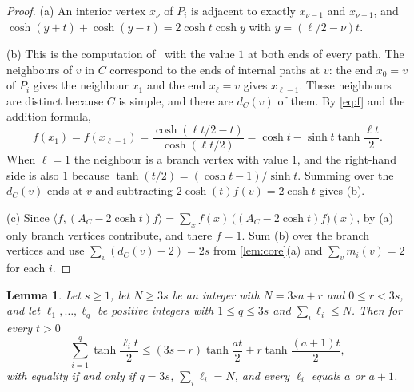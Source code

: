 \documentclass[11pt]{article}
\newtheorem{lemma}[theorem]{Lemma}
\theoremstyle{definition}
\theoremstyle{remark}
\begin{document}
\begin{proof}
(a) An interior vertex $x_\nu$ of $P_i$ is adjacent to exactly $x_{\nu-1}$ and $x_{\nu+1}$, and
$\cosh(y+t)+\cosh(y-t)=2\cosh t\cosh y$ with $y=(\ell/2-\nu)t$.

(b) This is the computation of~\cite[pp.~99--100]{Be19} with the value $1$ at both ends of every path. The neighbours
of $v$ in $C$ correspond to the ends of internal paths at $v$: the end $x_0=v$ of $P_i$ gives the
neighbour $x_1$ and the end $x_\ell=v$ gives $x_{\ell-1}$. These neighbours are distinct because $C$ is simple, and
there are $d_C(v)$ of them. By \eqref{eq:f} and the addition formula,
\[
f(x_1)=f(x_{\ell-1})=\frac{\cosh(\ell t/2-t)}{\cosh(\ell t/2)}=\cosh t-\sinh t\tanh\frac{\ell t}{2}.
\]
When $\ell=1$ the neighbour is a branch vertex with value $1$, and the right-hand side is also $1$ because
$\tanh(t/2)=(\cosh t-1)/\sinh t$. Summing over the $d_C(v)$ ends at $v$ and subtracting $2\cosh(t)f(v)=2\cosh t$ gives
(b).

(c) Since $\langle f,(A_C-2\cosh t)f\rangle=\sum_xf(x)\,\bigl((A_C-2\cosh t)f\bigr)(x)$, by (a) only branch vertices
contribute, and there $f=1$. Sum (b) over the branch vertices and use $\sum_v(d_C(v)-2)=2s$ from \cref{lem:core}(a) and
$\sum_vm_i(v)=2$ for each $i$.
\end{proof}

\begin{lemma}\label{lem:lengths}
Let $s\ge1$, let $N\ge3s$ be an integer with $N=3sa+r$ and $0\le r<3s$, and let $\ell_1,\dots,\ell_q$ be positive
integers with $1\le q\le3s$ and $\sum_i\ell_i\le N$. Then for every $t>0$
\[
\sum_{i=1}^q\tanh\frac{\ell_it}{2}\le(3s-r)\tanh\frac{at}{2}+r\tanh\frac{(a+1)t}{2},
\]
with equality if and only if $q=3s$, $\sum_i\ell_i=N$, and every $\ell_i$ equals $a$ or $a+1$.
\end{lemma}
\end{document}

